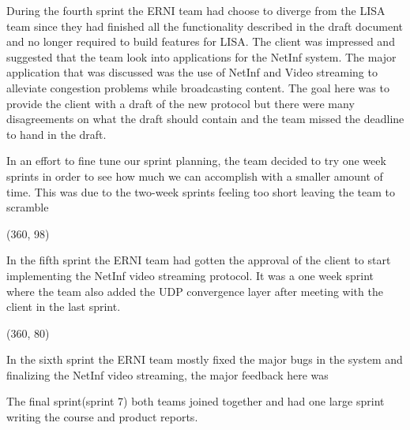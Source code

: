 During the fourth sprint the ERNI team had choose to diverge from the LISA team since they had finished all the functionality described in the draft document and no longer required to build features for LISA. The client was impressed and suggested that the team look into applications for the NetInf system. The major application that was discussed was the use of NetInf and Video streaming to alleviate congestion problems while broadcasting content. The goal here was to provide the client with a draft of the new protocol but there were many disagreements on what the draft should contain and the team missed the deadline to hand in the draft.

In an effort to fine tune our sprint planning, the team decided to try one week sprints in order to see how much we can accomplish with a smaller amount of time. This was due to the two-week sprints feeling too short leaving the team to scramble

\framebox(360, 98){
	
}

In the fifth sprint the ERNI team had gotten the approval of the client to start implementing the NetInf video streaming protocol. It was a one week sprint where the team also added the UDP convergence layer after meeting with the client in the last sprint.


\framebox(360, 80){
}

In the sixth sprint the ERNI team mostly fixed the major bugs in the system and finalizing the NetInf video streaming, the major feedback here was 

The final sprint(sprint 7) both teams joined together and had one large sprint writing the course and product reports.
